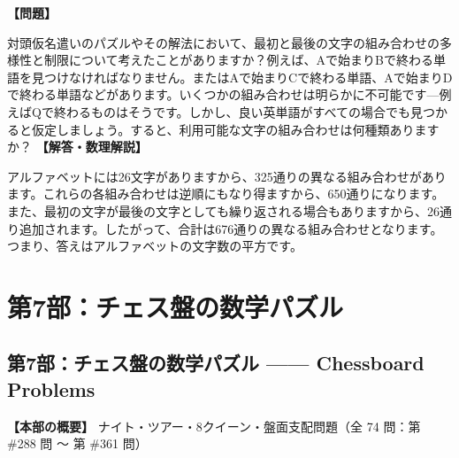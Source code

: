 \documentclass[10pt,a4paper,oneside,openany]{ltjsbook}
\begin{document}
\begin{tcolorbox}[colback=softblue,colframe=primaryblue,title=\textbf{第 287 問：acronym puzzle （原題: AN ACROSTIC PUZZLE.）},arc=2mm,boxrule=1pt,breakable]
\textbf{【問題】}\par\vspace{0.3em}
対頭仮名遣いのパズルやその解法において、最初と最後の文字の組み合わせの多様性と制限について考えたことがありますか？例えば、Aで始まりBで終わる単語を見つけなければなりません。またはAで始まりCで終わる単語、Aで始まりDで終わる単語などがあります。いくつかの組み合わせは明らかに不可能です—例えばQで終わるものはそうです。しかし、良い英単語がすべての場合でも見つかると仮定しましょう。すると、利用可能な文字の組み合わせは何種類ありますか？
\tcblower
\textbf{【解答・数理解説】}\par\vspace{0.3em}
アルファベットには26文字がありますから、325通りの異なる組み合わせがあります。これらの各組み合わせは逆順にもなり得ますから、650通りになります。また、最初の文字が最後の文字としても繰り返される場合もありますから、26通り追加されます。したがって、合計は676通りの異なる組み合わせとなります。つまり、答えはアルファベットの文字数の平方です。
\end{tcolorbox}

\part{第7部：チェス盤の数学パズル}
\chapter*{第7部：チェス盤の数学パズル —— Chessboard Problems}

\textbf{【本部の概要】} ナイト・ツアー・8クイーン・盤面支配問題（全 74 問：第 \#288 問 〜 第 \#361 問）

\vspace{1em}
\end{document}
